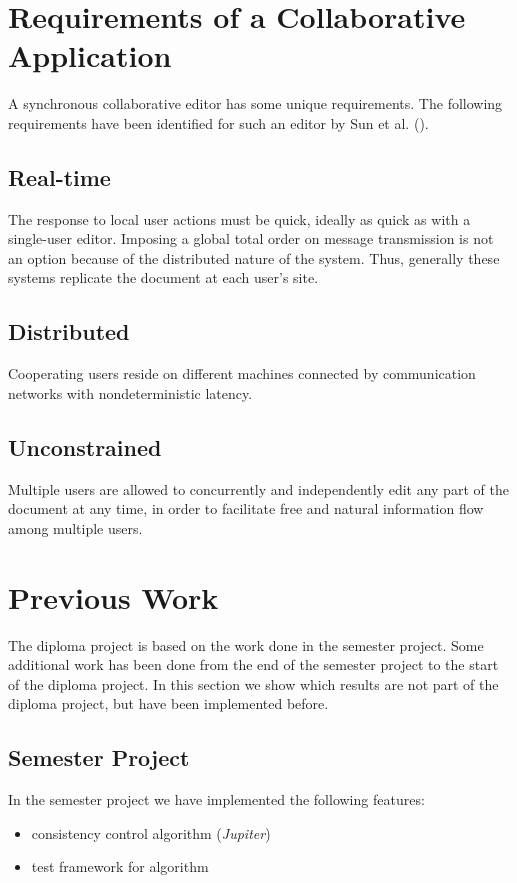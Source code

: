 \section{Requirements of a Collaborative Application}
A synchronous collaborative editor has some unique requirements.
The following requirements have been identified for such an editor
by Sun et al. (\cite{sun98a}).

\subsection{Real-time} 
The response to local user actions must be quick, ideally
as quick as with a single-user editor. Imposing a global total order on
message transmission is not
an option because of the distributed nature of the system. Thus, generally 
these systems replicate the document at each user's site.

\subsection{Distributed} 
Cooperating users reside on different machines 
connected by communication networks with nondeterministic latency.

\subsection{Unconstrained} 
Multiple users are allowed to concurrently and
independently edit any part of the document at any time, in order to 
facilitate free and natural information flow among multiple users.



\section{Previous Work}
\label{sect:overview.previouswork}

The diploma project is based on the work done in the semester project. Some
additional work has been done from the end of the semester
project to the start of the diploma project. In this section we show which
results are not part of the diploma project, but have been implemented
before.

\subsection{Semester Project}
In the semester project we have implemented the following features:
\begin{itemize}
 \item consistency control algorithm (\emph{Jupiter})
 \item test framework for algorithm
\end{itemize}

